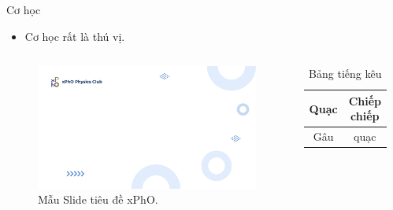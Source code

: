 \begin{frame}{Cơ học}
    \begin{itemize}
        \item Cơ học rất là thú vị. \cite{morin2008introduction}
    \end{itemize}
    \begin{columns}
        \begin{figure}
            \centering
            \includegraphics[width=0.5\linewidth]{Background/Title_slide_xPhO.pdf}
            \caption{Mẫu Slide tiêu đề xPhO.}
            \label{fig:xPhO_Slide}
        \end{figure}
        \begin{table}[!h]
            \centering
            \caption{Bảng tiếng kêu}
            \begin{tabular}{|c|c|}
                \hline
                Quạc & Chiếp chiếp \\
                \hline
                Gâu & quạc \\
                \hline
            \end{tabular}
            \label{tab:ec_ec}
        \end{table}
    \end{columns}
\end{frame}